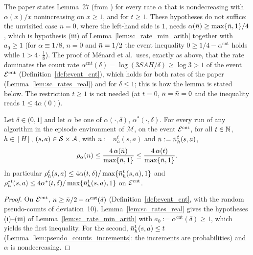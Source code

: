 \begin{remark}\label{rem:sc_lemma27}
The paper states Lemma~27 (from \cite[Lemma~7]{menard2021fast}) for every rate $\alpha$ that is
nondecreasing with $\alpha(x)/x$ nonincreasing on $x \ge 1$, and for $t \ge 1$. These hypotheses
do not suffice: the unvisited case $n = 0$, where the left-hand side is $1$, needs
$\alpha(\bar{n}) \ge \max\{\bar{n},1\}/4$, which is hypothesis (iii) of
Lemma~\ref{lem:sc_rate_min_arith} together with $a_0 \ge 1$ (for $\alpha \equiv 1/8$, $n = 0$ and
$\bar{n} = 1/2$ the event inequality $0 \ge 1/4 - \alpha^{\mathrm{cnt}}$ holds while $1 > 4\cdot\frac18$).
The proof of M\'enard et al.\ uses, exactly as above, that the rate dominates the count rate
$\alpha^{\mathrm{cnt}}(\delta) = \log(3SAH/\delta) \ge \log 3 > 1$ of the event
$\mathcal{E}^{\mathrm{cnt}}$ (Definition~\ref{def:event_cnt}), which holds for both rates of the paper
(Lemma~\ref{lem:sc_rates_real}) and for $\delta \le 1$; this is how the lemma is stated below.
The restriction $t \ge 1$ is not needed (at $t = 0$, $n = \bar{n} = 0$ and the inequality reads
$1 \le 4\alpha(0)$).
\end{remark}

\begin{lemma}\label{lem:pseudo_counts_bound}
\leanok
Let $\delta \in (0, 1]$ and let $\alpha$ be one of $\alpha(\cdot,\delta)$, $\alpha^*(\cdot,\delta)$.
For every run of any algorithm in the episode environment of $\mathcal M$, on the event
$\mathcal{E}^{\mathrm{cnt}}$, for all $t \in \mathbb{N}$, $h \in [H]$, $(s,a) \in \mathcal{S}\times\mathcal{A}$, with
$n := n_h^t(s,a)$ and $\bar{n} := \bar{n}_h^t(s,a)$,
\[
  \rho_\alpha(n) \le \frac{4\,\alpha(\bar{n})}{\max\{\bar{n}, 1\}} \le \frac{4\,\alpha(t)}{\max\{\bar{n},1\}} .
\]
In particular $\rho^t_h(s,a) \le 4\alpha(t,\delta)/\max\{\bar{n}_h^t(s,a),1\}$ and
$\rho^{*t}_h(s,a) \le 4\alpha^*(t,\delta)/\max\{\bar{n}_h^t(s,a),1\}$ on $\mathcal{E}^{\mathrm{cnt}}$.
\end{lemma}

\begin{proof}
\leanok
{}
On $\mathcal{E}^{\mathrm{cnt}}$, $n \ge \bar{n}/2 - \alpha^{\mathrm{cnt}}(\delta)$ (Definition~\ref{def:event_cnt}, with the
random pseudo-counts of deviation~10). Lemma~\ref{lem:sc_rates_real} gives the hypotheses
(i)--(iii) of Lemma~\ref{lem:sc_rate_min_arith} with $a_0 := \alpha^{\mathrm{cnt}}(\delta) \ge 1$,
which yields the first inequality. For the second, $\bar{n}_h^t(s,a) \le t$
(Lemma~\ref{lem:pseudo_counts_increments}: the increments are probabilities) and $\alpha$ is
nondecreasing.
\end{proof}

